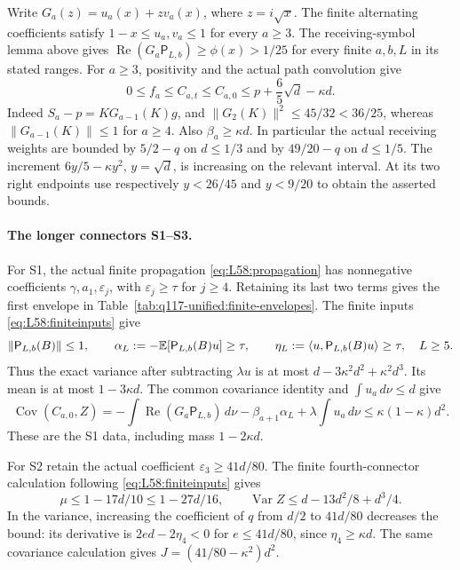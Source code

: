 Write \(G_a(z)=u_a(x)+zv_a(x)\), where \(z=i\sqrt x\).
The finite alternating coefficients satisfy
\(1-x\le u_a,v_a\le1\) for every \(a\ge3\).
The receiving-symbol lemma above gives
\(\operatorname{Re}(G_a\mathsf P_{L,b})\ge\phi(x)>1/25\)
for every finite \(a,b,L\) in its stated ranges.
For \(a\ge3\), positivity and the actual path convolution give
\begin{equation}\label{eq:q117-unified:receiver-profile}
 0\le f_a\le C_{a,t}\le C_{a,0}
 \le p+\frac65\sqrt d-\kappa d.
\end{equation}
Indeed \(S_a-p=KG_{a-1}(K)g\), and
\(\|G_2(K)\|^2\le45/32<36/25\), whereas
\(\|G_{a-1}(K)\|\le1\) for \(a\ge4\).
Also \(\beta_a\ge\kappa d\). In particular the actual
receiving weights are bounded by \(5/2-q\) on \(d\le1/3\)
and by \(49/20-q\) on \(d\le1/5\).
The increment \(6y/5-\kappa y^2\), \(y=\sqrt d\), is increasing
on the relevant interval. At its two right endpoints use respectively
\(y<26/45\) and \(y<9/20\) to obtain the asserted bounds.

\paragraph{The longer connectors S1--S3.}
For S1, the actual finite propagation
\eqref{eq:L58:propagation} has nonnegative coefficients
\(\gamma,a_1,\varepsilon_j\), with \(\varepsilon_j\ge\tau\)
for \(j\ge4\). Retaining its last two terms gives the first
envelope in Table~\ref{tab:q117-unified:finite-envelopes}.
The finite inputs \eqref{eq:L58:finiteinputs} give
\[
 \|\mathsf P_{L,b}(B)\|\le1,\qquad
 \alpha_L:=-\mathbb E[\mathsf P_{L,b}(B)u]\ge\tau,\qquad
 \eta_L:=\langle u,\mathsf P_{L,b}(B)u\rangle\ge\tau,
 \quad L\ge5.
\]
Thus the exact variance after subtracting \(\lambda u\) is at most
\(d-3\kappa^2d^2+\kappa^2d^3\). Its mean is at most
\(1-3\kappa d\). The common covariance identity and
\(\int u_a\,d\nu\le d\) give
\[
 \operatorname{Cov}(C_{a,0},Z)
 =-\int\operatorname{Re}(G_a\mathsf P_{L,b})\,d\nu
   -\beta_{a+1}\alpha_L+\lambda\int u_a\,d\nu
 \le\kappa(1-\kappa)d^2.
\]
These are the S1 data, including mass \(1-2\kappa d\).

For S2 retain the actual coefficient \(\varepsilon_3\ge41d/80\).
The finite fourth-connector calculation following
\eqref{eq:L58:finiteinputs} gives
\[
 \mu\le1-17d/10\le1-27d/16,
 \qquad
 \operatorname{Var}Z\le d-13d^2/8+d^3/4.
\]
In the variance, increasing the coefficient of \(q\) from \(d/2\)
to \(41d/80\) decreases the bound: its derivative is
\(2ed-2\eta_4<0\) for \(e\le41d/80\), since
\(\eta_4\ge\kappa d\). The same covariance calculation gives
\(J=(41/80-\kappa^2)d^2\).

